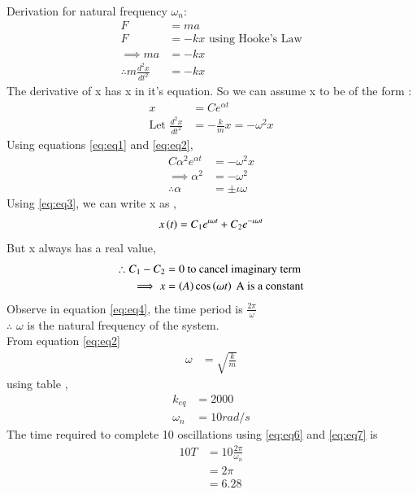\documentclass[journal,12pt,twocolumn]{IEEEtran}
\theoremstyle{remark}
\begin{document}
\solution\\

Derivation for natural frequency $\omega_n$:
\begin{align}
    F &= ma \\
    F &= -kx \text{ using Hooke's Law}\\
    \implies ma &= -kx\\
    \therefore m\frac{d^2x}{dt^2} &= -kx\label{eq:eq5}
\end{align}
The derivative of x has x in it's equation. So we can assume x to be of the form :
\begin{align}
    x &= Ce^{\alpha t} \label{eq:eq1}\\
    \text{Let } \frac{d^2x}{dt^2} &= -\frac{k}{m}x = -\omega^2 x \label{eq:eq2}
\end{align}
Using equations \eqref{eq:eq1} and \eqref{eq:eq2},
\begin{align}
    C\alpha^2 e^{\alpha t} &= -\omega^2 x\\
    \implies \alpha^2 &= -\omega^2\\
    \therefore \alpha &= \pm  \iota  \omega \label{eq:eq3}
\end{align}
Using \eqref{eq:eq3}, we can write x as ,
\begin{align}
    x\left(t\right) = C_1e^{\iota \omega t} + C_2e^{-\iota \omega t}
\end{align}
But x always has a real value,
\begin{align}
    \therefore C_1 - C_2 &= 0  \text{ to cancel imaginary term}\\
    \implies x  &= \left(A\right)\cos\left(\omega t\right)\label{eq:eq4} \text{ A is a constant}
\end{align}
Observe in equation \eqref{eq:eq4}, the time period is $\frac{2\pi}{\omega}$\\
$\therefore$ $\omega$ is the natural frequency of the system.\\
From equation \eqref{eq:eq2}
\begin{align}
    \omega &= \sqrt{\frac{k}{m}}
\end{align}
using table  ,
\begin{align}
    k_{eq} &= 2000 \label{eq:eq6}\\
    \omega_n &= 10 rad/s\label{eq:eq7}
\end{align}
The time required to complete 10 oscillations using \eqref{eq:eq6} and \eqref{eq:eq7} is \\
\begin{align}
    10T &= 10\frac{2\pi}{\omega_n}\\
    &= 2\pi\\
    &= 6.28
\end{align}
\end{document}
